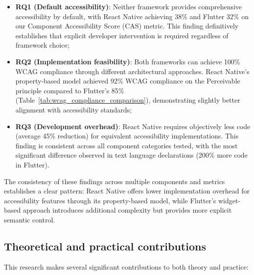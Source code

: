 \begin{itemize}
    \item \textbf{RQ1 (Default accessibility)}: Neither framework provides comprehensive accessibility by default, with React Native achieving 38\% and Flutter 32\% on our Component Accessibility Score (CAS) metric. This finding definitively establishes that explicit developer intervention is required regardless of framework choice;

    \item \textbf{RQ2 (Implementation feasibility)}: Both frameworks can achieve 100\% WCAG compliance through different architectural approaches. React Native's property-based model achieved 92\% WCAG compliance on the Perceivable principle compared to Flutter's 85\% (Table~\ref{tab:wcag_compliance_comparison}), demonstrating slightly better alignment with accessibility standards;

    \item \textbf{RQ3 (Development overhead)}: React Native requires objectively less code (average 45\% reduction) for equivalent accessibility implementations. This finding is consistent across all component categories tested, with the most significant difference observed in text language declarations (200\% more code in Flutter).
\end{itemize}

The consistency of these findings across multiple components and metrics establishes a clear pattern: React Native offers lower implementation overhead for accessibility features through its property-based model, while Flutter's widget-based approach introduces additional complexity but provides more explicit semantic control.

\subsection{Theoretical and practical contributions}
\label{subsec:conclusion-contributions}

This research makes several significant contributions to both theory and practice:

